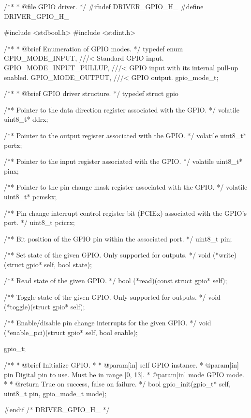 \begin{ccode}
/**
 * @file GPIO driver.
 */
#ifndef DRIVER_GPIO_H_
#define DRIVER_GPIO_H_

#include <stdbool.h>
#include <stdint.h>

/**
 * @brief Enumeration of GPIO modes.
 */
typedef enum
{
    GPIO_MODE_INPUT,        ///< Standard GPIO input.
    GPIO_MODE_INPUT_PULLUP, ///< GPIO input with its internal pull-up enabled.
    GPIO_MODE_OUTPUT,       ///< GPIO output.
} gpio_mode_t;

/**
 * @brief GPIO driver structure.
 */
typedef struct gpio
{
    /** Pointer to the data direction register associated with the GPIO. */
    volatile uint8_t* ddrx;

    /** Pointer to the output register associated with the GPIO. */
    volatile uint8_t* portx;

    /** Pointer to the input register associated with the GPIO. */
    volatile uint8_t* pinx;

    /** Pointer to the pin change mask register associated with the GPIO. */
    volatile uint8_t* pcmskx;

    /** Pin change interrupt control register bit (PCIEx) associated with the GPIO's port. */
    uint8_t pcicrx;

    /** Bit position of the GPIO pin within the associated port. */
    uint8_t pin;

    /** Set state of the given GPIO. Only supported for outputs. */
    void (*write)(struct gpio* self, bool state);

    /** Read state of the given GPIO. */
    bool (*read)(const struct gpio* self);

    /** Toggle state of the given GPIO. Only supported for outputs. */
    void (*toggle)(struct gpio* self);

    /** Enable/disable pin change interrupts for the given GPIO. */
    void (*enable_pci)(struct gpio* self, bool enable);
} gpio_t;

/**
 * @brief Initialize GPIO.
 *
 * @param[in] self GPIO instance.
 * @param[in] pin  Digital pin to use. Must be in range [0, 13].
 * @param[in] mode GPIO mode.
 *
 * @return True on success, false on failure.
 */
bool gpio_init(gpio_t* self, uint8_t pin, gpio_mode_t mode);

#endif /* DRIVER_GPIO_H_ */
\end{ccode}

